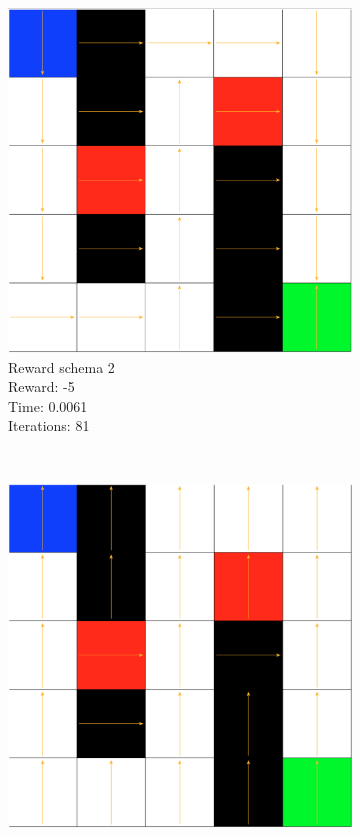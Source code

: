 \documentclass[a4paper,10pt]{article}
\begin{document}
\begin{figure}[H]
\begin{subfigure}[b]{0.3\textwidth}
                \includegraphics[width=\textwidth]{figures/5x5_viter_r2.png}
                \caption{Reward schema 2\\
                Reward: -5 \\
                Time:  0.0061\\
                Iterations: 81}
                \label{fig:v2}
        \end{subfigure}
        ~ %
        \begin{subfigure}[b]{0.3\textwidth}
                \includegraphics[width=\textwidth]{figures/5x5_viter_r3.png}

\end{subfigure}
\end{figure}
\end{document}
